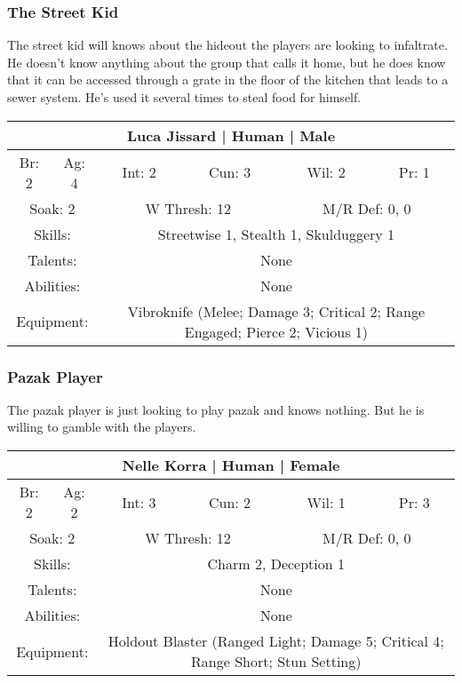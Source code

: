 \documentclass[letterpaper]{article}
\begin{document}
\subsubsection{The Street Kid}

The street kid will knows about the hideout the players are looking to infaltrate. He doesn't know anything about the group that calls it home, but he does know that it can be accessed through a grate in the floor of the kitchen that leads to a sewer system. He's used it several times to steal food for himself.

\begin{center}
\begin{tabular}{| c c c c c c |}
    \hline
    \multicolumn{6}{|c|}{Luca Jissard | Human | Male} \\
    \hline
    Br: 2 & Ag: 4 & Int: 2 & Cun: 3 & Wil: 2 & Pr: 1 \\[2mm]
    \multicolumn{2}{|c}{Soak: 2} & \multicolumn{2}{c}{W Thresh: 12} & \multicolumn{2}{c|}{M/R Def: 0, 0} \\
    \hline
    \multicolumn{2}{|c}{Skills:} & \multicolumn{4}{p{5cm}|}{Streetwise 1, Stealth 1, Skulduggery 1} \\
    \multicolumn{2}{|c}{Talents:} & \multicolumn{4}{p{5cm}|}{None} \\
    \multicolumn{2}{|c}{Abilities:} & \multicolumn{4}{p{5cm}|}{None} \\
    \multicolumn{2}{|c}{Equipment:} & \multicolumn{4}{p{5cm}|}{Vibroknife (Melee; Damage 3; Critical 2; Range Engaged; Pierce 2; Vicious 1)} \\
    \hline
\end{tabular}
\end{center}

\subsubsection{Pazak Player}

The pazak player is just looking to play pazak and knows nothing. But he is willing to gamble with the players.

\begin{center}
\begin{tabular}{| c c c c c c |}
    \hline
    \multicolumn{6}{|c|}{Nelle Korra | Human | Female} \\
    \hline
    Br: 2 & Ag: 2 & Int: 3 & Cun: 2 & Wil: 1 & Pr: 3 \\[2mm]
    \multicolumn{2}{|c}{Soak: 2} & \multicolumn{2}{c}{W Thresh: 12} & \multicolumn{2}{c|}{M/R Def: 0, 0} \\
    \hline
    \multicolumn{2}{|c}{Skills:} & \multicolumn{4}{p{5cm}|}{Charm 2, Deception 1} \\
    \multicolumn{2}{|c}{Talents:} & \multicolumn{4}{p{5cm}|}{None} \\
    \multicolumn{2}{|c}{Abilities:} & \multicolumn{4}{p{5cm}|}{None} \\
    \multicolumn{2}{|c}{Equipment:} & \multicolumn{4}{p{5cm}|}{Holdout Blaster (Ranged Light; Damage 5; Critical 4; Range Short; Stun Setting)} \\
    \hline
\end{tabular}
\end{center}
\end{document}
